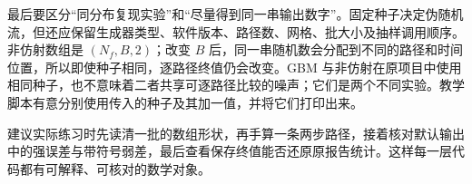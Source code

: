 最后要区分“同分布复现实验”和“尽量得到同一串输出数字”。固定种子决定伪随机流，但还应保留生成器类型、软件版本、路径数、网格、批大小及抽样调用顺序。非仿射数组是 $(N_f,B,2)$；改变 $B$ 后，同一串随机数会分配到不同的路径和时间位置，所以即使种子相同，逐路径终值仍会改变。GBM 与非仿射在原项目中使用相同种子，也不意味着二者共享可逐路径比较的噪声；它们是两个不同实验。教学脚本有意分别使用传入的种子及其加一值，并将它们打印出来。

建议实际练习时先读清一批的数组形状，再手算一条两步路径，接着核对默认输出中的强误差与带符号弱差，最后查看保存终值能否还原原报告统计。这样每一层代码都有可解释、可核对的数学对象。
